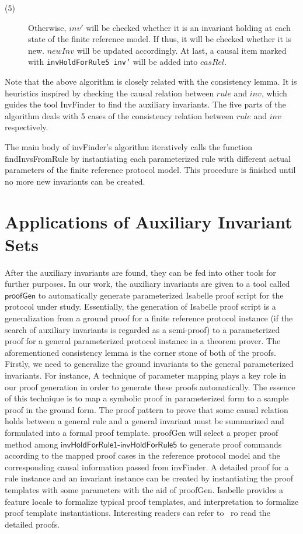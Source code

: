 \documentclass{llncs}
\begin{document}
\begin{description}
    \item[(5)] Otherwise, $inv'$ will be checked whether it is an invariant holding at each state of the finite reference model. If thus, it
    will be checked whether it is new. $newInv$ will be updated
    accordingly. At last, a causal item marked with {\tt invHoldForRule5
    inv'} will be added into $casRel$.
 \end{description}

Note that the above algorithm is closely related with the
consistency lemma. It is heuristics inspired by checking the causal
relation between $rule$ and $inv$,  which guides the tool {\sf
InvFinder} to find the auxiliary invariants. The five parts of the
algorithm deals with 5 cases of the consistency relation between
$rule$ and $inv$ respectively.

The main body of {\sf invFinder}'s algorithm iteratively calls the function
{\sf findInvsFromRule}  by instantiating each parameterized rule
with different actual parameters of the finite reference protocol
model. This procedure is  finished until no more new invariants can be created.


\section{Applications of Auxiliary Invariant Sets}
 After the auxiliary invariants   are found,
 they can be fed into other
tools for further purposes. In our work, the auxiliary invariants
are given to a tool called $\mathsf{proofGen}$ to automatically
generate parameterized Isabelle proof script for the protocol under
study. Essentially, the generation of Isabelle proof script is a
generalization from a ground proof for a finite reference protocol
instance (if the search of auxiliary invariants is regarded as a
semi-proof) to a parameterized proof for a general parameterized
protocol instance in a theorem prover. The aforementioned
consistency lemma is the corner stone of both of the proofs. Firstly,
we need to generalize the ground invariants to the general
parameterized invariants. For instance,
 A technique of parameter mapping plays a key role in our proof generation in order to
generate these proofs automatically. The essence of this technique
is to map a symbolic proof in parameterized form to a sample proof
in the ground form. The proof pattern to prove that some causal
relation holds between a general rule and a general invariant must
be summarized and formulated into a formal proof template.
%
{\sf proofGen} will select a proper proof method among
$\mathsf{invHoldForRule1}$-$\mathsf{invHoldForRule5}$ to generate
proof commands according to the mapped proof cases in the reference
protocol model and the corresponding causal information passed from
{\sf invFinder}. A detailed proof for a rule instance and an
invariant instance can be created by instantiating the proof
templates with some parameters with the aid of {\sf proofGen}.
Isabelle provides a feature {\sf locale} to formalize typical proof
templates, and {\sf interpretation} to formalize proof template
instantiations. Interesting readers can refer to~\cite{LiCache13} ro
read the detailed proofs.
\end{document}
